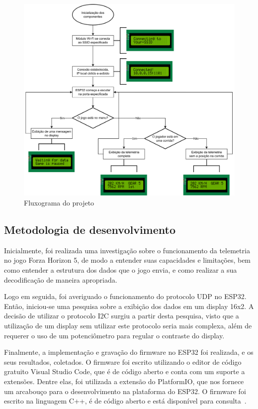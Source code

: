 \documentclass[12pt]{article}
\begin{document}
\begin{figure}[ht]
  \centering
  \includegraphics[width=1\textwidth]{images/project_fluxogram.png}
  \caption{Fluxograma do projeto}
  \label{fig:project_fluxogram}
\end{figure}

\subsection{Metodologia de desenvolvimento}

Inicialmente, foi realizada uma  investigação sobre o funcionamento da telemetria no jogo Forza Horizon 5,
de modo a entender suas capacidades e limitações, bem como entender a estrutura dos dados que o jogo envia, e
como realizar a sua decodificação de maneira apropriada.

Logo em seguida, foi averiguado o funcionamento do protocolo UDP no ESP32.
Então, iniciou-se uma pesquisa sobre a exibição dos dados em um display 16x2. A decisão de utilizar
o protocolo I2C surgiu a partir desta pesquisa, visto que a utilização de um display sem utilizar este protocolo
seria mais complexa, além de requerer o uso de um potenciômetro para regular o contraste do display.

Finalmente, a implementação e gravação do firmware no ESP32 foi realizada, e os seus resultados, coletados.
O firmware foi escrito utilizando o editor de código gratuito Visual Studio Code, que é de código aberto e conta
com um suporte a extensões. Dentre elas, foi utilizada a extensão do PlatformIO, que nos fornece um arcabouço para o
desenvolvimento na plataforma do ESP32.
O firmware foi escrito na linguagem C++, é de código aberto e está disponível para consulta~\cite{forza-monitor, vscode, platformio}.
\end{document}
